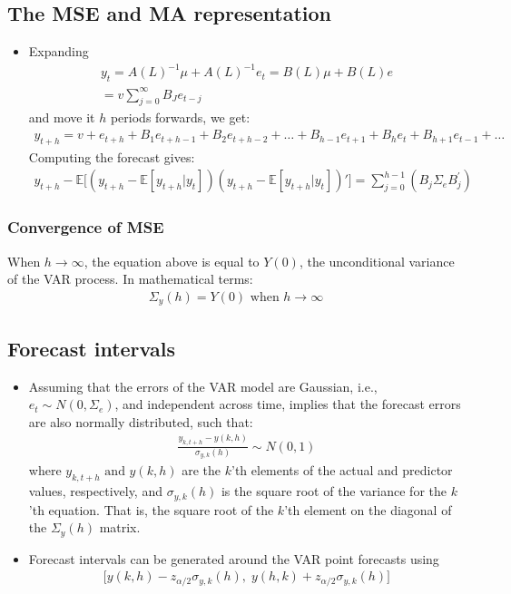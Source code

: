 \documentclass[10pt]{article}
\begin{document}
\subsection{The MSE and MA representation}
\begin{itemize}
    \item Expanding 
    \begin{gather*}
        y_t = A(L)^{-1}\mu + A(L)^{-1}e_t = B(L)\mu + B(L)e\\
        = v \sum_{j = 0}^{\infty}B_Je_{t - j}
    \end{gather*}
    and move it $h $ periods forwards, we get: 
    \begin{gather*}
        y_{t + h} = v + e_{t + h} + B_1e_{t + h - 1} + B_2e_{t + h - 2} + \dots + B_{h - 1}e_{t + 1} + B_he_t + B_{h + 1}e_{t - 1} + \dots
    \end{gather*}
    Computing the forecast gives: 
    \begin{gather*}
        y_{t +h} - \mathbb{E}\big[(y_{t + h} - \mathbb{E}[y_{t + h}|y_t])(y_{t + h} - \mathbb{E}[y_{t + h}|y_t])'\big] = \sum_{j = 0}^{h - 1}\left(B_j\Sigma_e B_j^{\prime}\right)
    \end{gather*}
\end{itemize}
\subsubsection{Convergence of MSE}
When $h\to\infty $, the equation above is equal to $Y(0) $, the unconditional variance of the VAR process. In mathematical terms: 
\begin{gather*}
    \Sigma_y(h) = Y(0)\text{ when }h\to\infty 
\end{gather*}
\newpage 
\subsection{Forecast intervals}
\begin{itemize}
    \item Assuming that the errors of the VAR model are Gaussian, i.e., $e_t\sim N(0, \Sigma_e) $, and independent across time, implies that the forecast errors are also normally distributed, such that: 
    \begin{gather*}
        \frac{y_{k, t + h} - y(k, h)}{\sigma_{y, k}(h)}\sim N(0, 1)
    \end{gather*}
    where $y_{k, t + h} \text{ and } y(k, h)$ are the $k $'th elements of the actual and predictor values, respectively, and $\sigma_{y, k}(h) $ is the square root of the variance for the $k $'th equation. That is, the square root of the $k $'th element on the diagonal of the $\Sigma_y(h) $ matrix. 
    \item Forecast intervals can be generated around the VAR point forecasts using 
    \begin{gather*}
        \big[y(k,h) - z_{\alpha/2}\sigma_{y, k}(h),\; y(h, k) + z_{\alpha / 2}\sigma_{y, k}(h)\big]
    \end{gather*}
\end{itemize}
\end{document}
